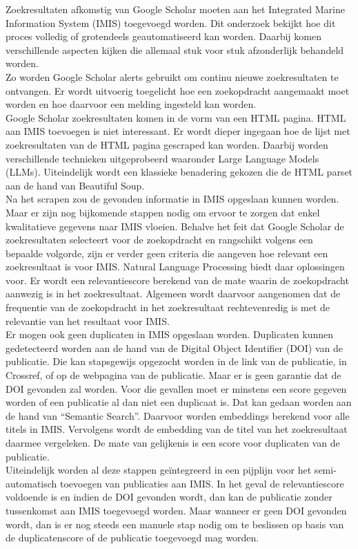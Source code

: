 Zoekresultaten afkomstig van Google Scholar moeten aan het Integrated Marine Information System (IMIS) toegevoegd worden. Dit onderzoek bekijkt hoe dit proces volledig of grotendeels geautomatiseerd kan worden. Daarbij komen verschillende aspecten kijken die allemaal stuk voor stuk afzonderlijk behandeld worden.\\
Zo worden Google Scholar alerts gebruikt om continu nieuwe zoekresultaten te ontvangen. Er wordt uitvoerig toegelicht hoe een zoekopdracht aangemaakt moet worden en hoe daarvoor een melding ingesteld kan worden.\\
Google Scholar zoekresultaten komen in de vorm van een HTML pagina. HTML aan IMIS toevoegen is niet interessant. Er wordt dieper ingegaan hoe de lijst met zoekresultaten van de HTML pagina gescraped kan worden. Daarbij worden verschillende technieken uitgeprobeerd waaronder Large Language Models (LLMs). Uiteindelijk wordt een klassieke benadering gekozen die de HTML parset aan de hand van Beautiful Soup.\\
Na het scrapen zou de gevonden informatie in IMIS opgeslaan kunnen worden. Maar er zijn nog bijkomende stappen nodig om ervoor te zorgen dat enkel kwalitatieve gegevens naar IMIS vloeien.
Behalve het feit dat Google Scholar de zoekresultaten selecteert voor de zoekopdracht en rangschikt volgens een bepaalde volgorde, zijn er verder geen criteria die aangeven hoe relevant een zoekresultaat is voor IMIS. Natural Language Processing biedt daar oplossingen voor. Er wordt een relevantiescore berekend van de mate waarin de zoekopdracht aanwezig is in het zoekresultaat. Algemeen wordt daarvoor aangenomen dat de frequentie van de zoekopdracht in het zoekresultaat rechtevenredig is met de relevantie van het resultaat voor IMIS.\\
Er mogen ook geen duplicaten in IMIS opgeslaan worden. Duplicaten kunnen gedetecteerd worden aan de hand van de Digital Object Identifier (DOI) van de publicatie. Die kan stapsgewijs opgezocht worden in de link van de publicatie, in Crossref, of op de webpagina van de publicatie. Maar er is geen garantie dat de DOI gevonden zal worden. Voor die gevallen moet er minstens een score gegeven worden of een publicatie al dan niet een duplicaat is. Dat kan gedaan worden aan de hand van ``Semantic Search''. Daarvoor worden embeddings berekend voor alle titels in IMIS. Vervolgens wordt de embedding van de titel van het zoekresultaat daarmee vergeleken. De mate van gelijkenis is een score voor duplicaten van de publicatie.\\
Uiteindelijk worden al deze stappen geïntegreerd in een pijplijn voor het semi-automatisch toevoegen van publicaties aan IMIS. In het geval de relevantiescore voldoende is en indien de DOI gevonden wordt, dan kan de publicatie zonder tussenkomst aan IMIS toegevoegd worden. Maar wanneer er geen DOI gevonden wordt, dan is er nog steeds een manuele stap nodig om te beslissen op basis van de duplicatenscore of de publicatie toegevoegd mag worden.
